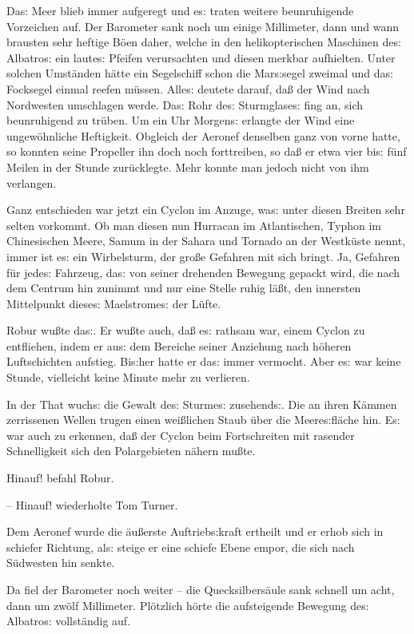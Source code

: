 \documentclass[oneside,12pt]{book}
\newcommand{\s}{s:}
\begin{document}
Da{\s} Meer blieb immer aufgeregt und e{\s} traten weitere
beunruhigende Vorzeichen auf. Der Barometer sank noch um einige
Millimeter, dann und wann brausten sehr heftige B\"oen daher, welche
in den helikopterischen Maschinen de{\s} {\glqq}Albatro{\s}{\grqq}
ein laute{\s} Pfeifen verursachten und diesen merkbar aufhielten.
Unter solchen Umst\"anden h\"atte ein Segelschiff schon die
Mar{\s}segel zweimal und da{\s} Focksegel einmal reefen m\"ussen.
Alle{\s} deutete darauf, da{\ss} der Wind nach Nordwesten umschlagen
werde. Da{\s} Rohr de{\s} Sturmglase{\s} fing an, sich beunruhigend
zu tr\"uben. Um ein Uhr Morgen{\s} erlangte der Wind eine
ungew\"ohnliche Heftigkeit. Obgleich der Aeronef denselben ganz von
vorne hatte, so konnten seine Propeller ihn doch noch forttreiben, so
da{\ss} er etwa vier bi{\s} f\"unf Meilen in der Stunde
zur\"ucklegte. Mehr konnte man jedoch nicht von ihm verlangen.

Ganz entschieden war jetzt ein Cyclon im Anzuge, wa{\s} unter diesen
Breiten sehr selten vorkommt. Ob man diesen nun Hurracan im
Atlantischen, Typhon im Chinesischen Meere, Samum in der Sahara und
Tornado an der Westk\"uste nennt, immer ist e{\s} ein Wirbelsturm,
der gro{\ss}e Gefahren mit sich bringt. Ja, Gefahren f\"ur jede{\s}
Fahrzeug, da{\s} von seiner drehenden Bewegung gepackt wird, die nach
dem Centrum hin zunimmt und nur eine Stelle ruhig l\"a{\ss}t, den
innersten Mittelpunkt diese{\s} Maelstrome{\s} der L\"ufte.

Robur wu{\ss}te da{\s}. Er wu{\ss}te auch, da{\ss} e{\s} rathsam war,
einem Cyclon zu entfliehen, indem er au{\s} dem Bereiche seiner
Anziehung nach h\"oheren Luftschichten aufstieg. Bi{\s}her hatte er
da{\s} immer vermocht. Aber e{\s} war keine Stunde, vielleicht keine
Minute mehr zu verlieren.

In der That wuch{\s} die Gewalt de{\s} Sturme{\s} zusehend{\s}. Die
an ihren K\"ammen zerrissenen Wellen trugen einen wei{\ss}lichen
Staub \"uber die Meere{\s}fl\"ache hin. E{\s} war auch zu erkennen,
da{\ss} der Cyclon beim Fortschreiten mit rasender Schnelligkeit sich
den Polargebieten n\"ahern mu{\ss}te.

{\glqq}Hinauf! befahl Robur.

-- Hinauf!{\grqq} wiederholte Tom Turner.

Dem Aeronef wurde die \"au{\ss}erste Auftrieb{\s}kraft ertheilt und
er erhob sich in schiefer Richtung, al{\s} steige er eine schiefe
Ebene empor, die sich nach S\"udwesten hin senkte.

Da fiel der Barometer noch weiter -- die Quecksilbers\"aule sank
schnell um acht, dann um zw\"olf Millimeter. Pl\"otzlich h\"orte die
aufsteigende Bewegung de{\s} {\glqq}Albatro{\s}{\grqq} vollst\"andig
auf.
\end{document}
